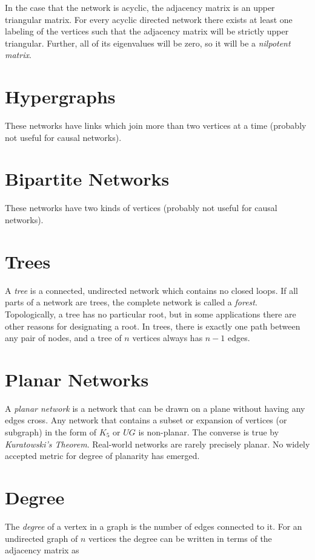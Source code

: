 \documentclass[12pt]{book}
\begin{document}
In the case that the network is acyclic, the adjacency matrix is an upper triangular matrix.  For every acyclic directed network there exists at least one labeling of the vertices such that the adjacency matrix will be strictly upper triangular.  Further, all of its eigenvalues will be zero, so it will be a \textit{nilpotent matrix}.

\section{Hypergraphs}
These networks have links which join more than two vertices at a time (probably not useful for causal networks).

\section{Bipartite Networks}
These networks have two kinds of vertices (probably not useful for causal networks).

\section{Trees}
A \textit{tree} is a connected, undirected network which contains no closed loops.  If all parts of a network are trees, the complete network is called a \textit{forest}.  Topologically, a tree has no particular root, but in some applications there are other reasons for designating a root.  In trees, there is exactly one path between any pair of nodes, and a tree of $n$ vertices always has $n-1$ edges.

\section{Planar Networks}
A \textit{planar network} is a network that can be drawn on a plane without having any edges cross.  Any network that contains a subset or expansion of vertices (or subgraph) in the form of $K_5$ or $UG$ is non-planar.  The converse is true by \textit{Kuratowski's Theorem}.  Real-world networks are rarely precisely planar.  No widely accepted metric for degree of planarity has emerged.

\section{Degree}
The \textit{degree} of a vertex in a graph is the number of edges connected to it.  For an undirected graph of $n$ vertices the degree can be written in terms of the adjacency matrix as
\end{document}
